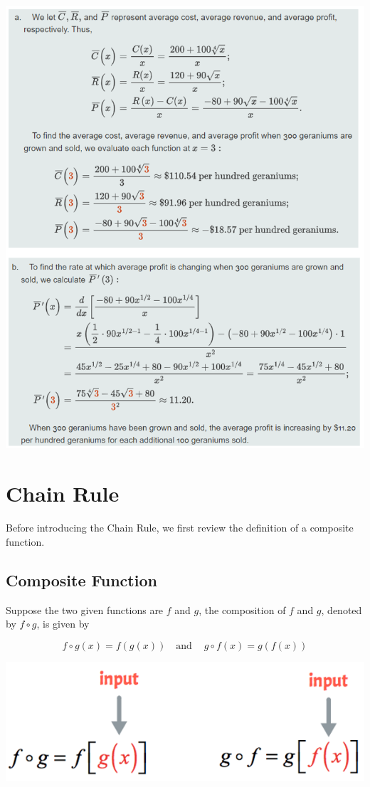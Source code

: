 \documentclass[
]{book}
\begin{document}
\begin{center}\includegraphics[width=0.75\linewidth]{img03/w03-AvgCostRevnueProfitExample} \end{center}

\hfill\break

\hypertarget{chain-rule}{%
\section{Chain Rule}\label{chain-rule}}

Before introducing the Chain Rule, we first review the definition of a composite function.

\hypertarget{composite-function}{%
\subsection{Composite Function}\label{composite-function}}

Suppose the two given functions are \(f\) and \(g\), the composition of \(f\) and \(g\), denoted by \(f\circ g\), is given by

\[
f\circ g (x) = f(g(x))  \  \  \  \text{   and   }  \ \ \ \ g\circ f (x) = g(f(x))
\]

\begin{center}\includegraphics[width=0.55\linewidth]{img03/w03-CompositeFunction} \end{center}
\end{document}

